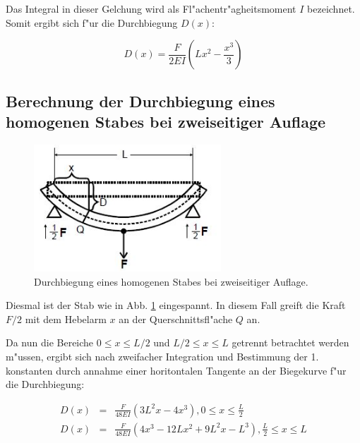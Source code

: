 		Das Integral in dieser Gelchung wird als Fl"achentr"agheitsmoment $I$ bezeichnet. Somit ergibt sich f"ur die Durchbiegung $D(x)$:

		\begin{equation}
			D(x) = \frac{F}{2EI} \left( Lx^2- \frac{x^3}{3} \right)
		\end{equation}

	\subsection{Berechnung der Durchbiegung eines homogenen Stabes bei zweiseitiger Auflage} %
	\label{sub:2}

	\begin{figure}[!h]
		\centering
		\includegraphics[width = 7cm]{img/biegung2.JPG}
		\caption{Durchbiegung eines homogenen Stabes bei zweiseitiger Auflage.}
		\label{fg:biegung2}
	\end{figure}

	Diesmal ist der Stab wie in Abb. \ref{fg:biegung2} eingespannt. In diesem Fall greift die Kraft $F/2$ mit dem Hebelarm $x$ an der Querschnittsfl"ache $Q$ an. 

	Da nun die Bereiche $0 \leq x \leq L/2$ und $L/2 \leq x \leq L$ getrennt betrachtet werden m"ussen, ergibt sich nach zweifacher Integration und Bestimmung der 1. konstanten durch annahme einer horitontalen Tangente an der Biegekurve  f"ur die Durchbiegung:

	\begin{eqnarray}
		D(x) &=& \frac{F}{48EI}(3L^2x-4x^3) , 0 \leq x \leq \frac{L}{2} \\
		D(x) &=& \frac{F}{48EI}(4x^3-12Lx^2+9L^2x-L^3) , \frac{L}{2} \leq x \leq L
	\end{eqnarray}

